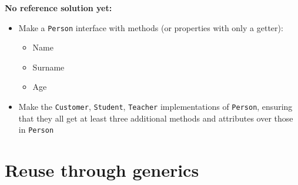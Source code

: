         \textbf{No reference solution yet:}
        \begin{itemize}
            \item Make a \texttt{Person} interface with methods (or properties with only a getter):
            \begin{itemize}
                \item Name
                \item Surname
                \item Age
            \end{itemize}

            \item Make the \texttt{Customer}, \texttt{Student}, \texttt{Teacher} implementations of \texttt{Person}, ensuring that they all get at least three additional methods and attributes over those in \texttt{Person}
        \end{itemize}

\chapter{Reuse through generics}
